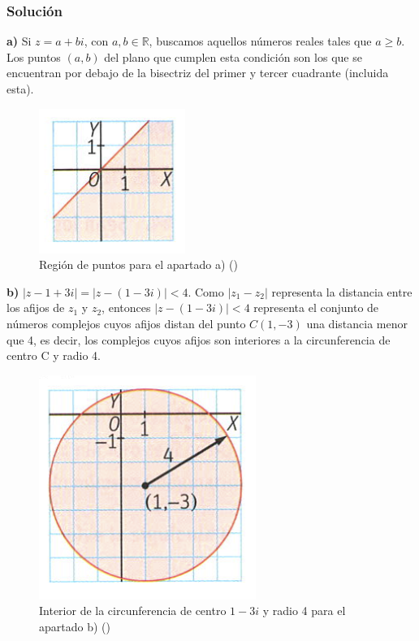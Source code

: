 \documentclass[../main.tex]{memoir}
\begin{document}
\subsubsection{Solución}

\textbf{a)} Si $z= a+bi$, con $a,b \in \mathbb{R}$, buscamos aquellos números reales tales que $a\geq b$. Los puntos $(a,b)$ del plano que cumplen esta condición son los que se encuentran por debajo de la bisectriz del primer y tercer cuadrante (incluida esta). 

\begin{figure}[H]
	\centering
	\includegraphics[scale=0.45]{images/region1.png}
	\caption{Región de puntos para el apartado a) (\cite{sm1bach})}
	\label{region1}
\end{figure}

\textbf{b)} $|z-1+3i| = |z- (1-3i)| <4$. Como $|z_1-z_2|$ representa la distancia entre los afijos de $z_1$ y $z_2$, entonces $|z- (1-3i)| <4$ representa el conjunto de números complejos cuyos afijos distan del punto $C(1,-3)$ una distancia menor que 4, es decir, los complejos cuyos afijos son interiores a la circunferencia de centro C y radio 4.

\begin{figure}[H]
	\centering
	\includegraphics[scale=0.4]{images/region2.png}
	\caption{Interior de la circunferencia de centro $1-3i$ y radio 4 para el apartado b) (\cite{sm1bach})}
	\label{region2}
\end{figure}
\end{document}
